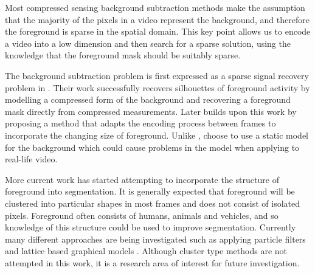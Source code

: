 Most compressed sensing background subtraction methods \citep{Cevher2008a, Cevher2008b, Warnell2011, Cossalter2009} make the assumption that the majority of the pixels in a video represent the background, and therefore the foreground is sparse in the spatial domain. This key point allows us to encode a video into a low dimension and then search for a sparse solution, using the knowledge that the foreground mask should be suitably sparse. 

The background subtraction problem is first expressed as a sparse signal recovery problem in \cite{Cevher2008b}. Their work successfully recovers silhouettes of foreground activity by modelling a compressed form of the background and recovering a foreground mask directly from compressed measurements. Later \cite{Warnell2011} builds upon this work by proposing a method that adapts the encoding process between frames to incorporate the changing size of foreground. Unlike \cite{Cevher2008b}, \cite{Warnell2011} choose to use a static model for the background which could cause problems in the model when applying to real-life video. 

More current work has started attempting to incorporate the structure of foreground into segmentation. It is generally expected that foreground will be clustered into particular shapes in most frames and does not consist of isolated pixels. Foreground often consists of humans, animals and vehicles, and so knowledge of this structure could be used to improve segmentation. Currently many different approaches are being investigated such as applying particle filters \citep{Cossalter2009} and lattice based graphical models \citep{Cevher2008a}. Although cluster type methods are not attempted in this work, it is a research area of interest for future investigation. 



